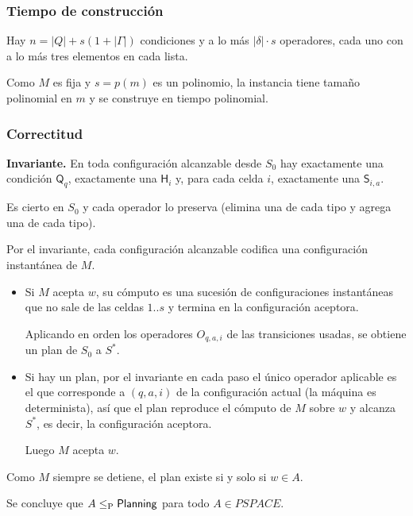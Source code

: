 \documentclass[11pt,letterpaper]{article}
\theoremstyle{plain}
\theoremstyle{definition}
\theoremstyle{remark}
\newcommand{\nombreMat}[1]{\ensuremath{\text{\fontencoding{OT1}\fontfamily{cmss}\upshape\selectfont #1}}}
\newcommand{\PSPACE}{\nombreMat{PSPACE}}
\newcommand{\NP}{\nombreMat{NP}}
\newcommand{\coNP}{\nombreMat{co-NP}}
\newcommand{\PLANNING}{\nombreMat{Planning}}
\def\PSPACE{PSPACE}\def\NP{NP}\def\coNP{co-NP}%
\newcommand{\ptime}{\leq_{\mathrm{P}}}
\newcommand{\cond}[1]{\mathsf{#1}}
\begin{document}
\subsubsection{Tiempo de construcción}

Hay $n=|Q|+s(1+|\Gamma|)$ condiciones
y a lo más $|\delta|\cdot s$ operadores,
cada uno con a lo más tres elementos en
cada lista.

Como $M$ es fija y $s=p(m)$ es un polinomio,
la instancia tiene tamaño polinomial en $m$
y se construye en tiempo polinomial.

\subsubsection{Correctitud}

\textbf{Invariante.}
En toda configuración alcanzable desde $S_0$
hay exactamente una condición $\cond{Q}_q$,
exactamente una $\cond{H}_i$ y,
para cada celda $i$, exactamente una
$\cond{S}_{i,a}$.

Es cierto en $S_0$ y cada operador lo preserva
(elimina una de cada tipo y agrega una de cada tipo).

Por el invariante, cada configuración alcanzable
codifica una configuración instantánea de $M$.

\begin{itemize}[leftmargin=1.5em,itemsep=2pt]

\item[($\Rightarrow$)]
Si $M$ acepta $w$, su cómputo es una sucesión
de configuraciones instantáneas que no sale
de las celdas $1..s$ y termina en la
configuración aceptora.

Aplicando en orden los operadores $O_{q,a,i}$
de las transiciones usadas, se obtiene un plan
de $S_0$ a $S^{*}$.

\item[($\Leftarrow$)]
Si hay un plan, por el invariante en cada paso
el único operador aplicable es el que corresponde
a $(q,a,i)$ de la configuración actual
(la máquina es determinista), así que el plan
reproduce el cómputo de $M$ sobre $w$ y alcanza
$S^{*}$, es decir, la configuración aceptora.

Luego $M$ acepta $w$.

\end{itemize}

Como $M$ siempre se detiene, el plan existe
si y solo si $w\in A$.

Se concluye que $A\ptime\PLANNING$ para
todo $A\in\PSPACE$.
\end{document}
